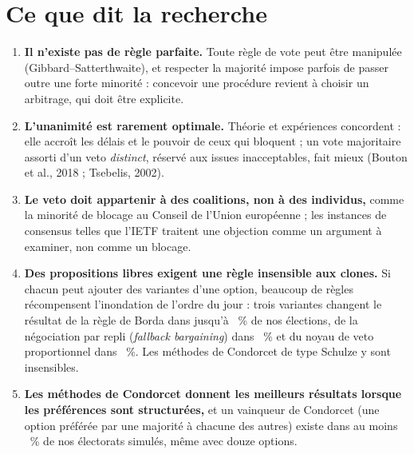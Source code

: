 \documentclass[10pt,a4paper]{article}
\begin{document}
\section{Ce que dit la recherche}
\begin{enumerate}[label=\textbf{\arabic*.}]
  \item \textbf{Il n'existe pas de règle parfaite.} Toute règle de vote peut être manipulée
  (Gibbard--Satterthwaite), et respecter la majorité impose parfois de passer outre une forte minorité :
  concevoir une procédure revient à choisir un arbitrage, qui doit être explicite.
  \item \textbf{L'unanimité est rarement optimale.} Théorie et expériences concordent : elle accroît
  les délais et le pouvoir de ceux qui bloquent ; un vote majoritaire assorti d'un veto \emph{distinct},
  réservé aux issues inacceptables, fait mieux (Bouton et al., 2018 ; Tsebelis, 2002).
  \item \textbf{Le veto doit appartenir à des coalitions, non à des individus,} comme la minorité de
  blocage au Conseil de l'Union européenne ; les instances de consensus telles que l'IETF traitent une
  objection comme un argument à examiner, non comme un blocage.
  \item \textbf{Des propositions libres exigent une règle insensible aux \og clones\fg{}.} Si chacun
  peut ajouter des variantes d'une option, beaucoup de règles récompensent l'inondation de l'ordre du
  jour : trois variantes changent le résultat de la règle de Borda dans jusqu'à \KNclonesBorda~\% de nos
  élections, de la négociation par repli (\emph{fallback bargaining}) dans \KNclonesFallback~\% et du
  noyau de veto proportionnel dans \KNclonesPVC~\%. Les méthodes de Condorcet de type Schulze y sont
  insensibles.
  \item \textbf{Les méthodes de Condorcet donnent les meilleurs résultats lorsque les préférences sont
  structurées,} et un vainqueur de Condorcet (une option préférée par une majorité à chacune des autres)
  existe dans au moins \KNcwPolarisedTwelve~\% de nos électorats simulés, même avec douze options.
\end{enumerate}
\end{document}
